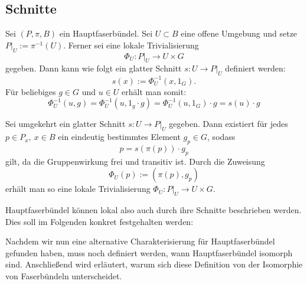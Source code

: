 \subsection{Schnitte}

Sei $(P, \pi, B)$ ein Hauptfaserbündel. Sei $U \subset B$ eine offene Umgebung und setze $P|_U := \pi^{-1}(U)$. Ferner sei eine lokale Trivialisierung \[\Phi_U \colon P|_U \to U \times G\] gegeben.
Dann kann wie folgt ein glatter Schnitt $s \colon U \to P|_U$ definiert werden: \[s(x) := \Phi_U^{-1}(x,1_G).\]
Für beliebiges $g \in G$ und $u \in U$ erhält man somit: \[\Phi_U^{-1}(u,g) = \Phi_U^{-1}(u,1_g \cdot g) = \Phi_U^{-1}(u,1_G) \cdot g = s(u) \cdot g\]

Sei umgekehrt ein glatter Schnitt $s \colon U \to P|_U$ gegeben. Dann existiert für jedes $p \in P_x, \ x \in B$ ein eindeutig bestimmtes Element $g_p \in G$, sodass \[p = s(\pi(p)) \cdot g_p\] gilt,
da die Gruppenwirkung frei und transitiv ist.
Durch die Zuweisung \[\Phi_U(p) := (\pi(p), g_p)\] erhält man so eine lokale Trivialisierung $\Phi_U \colon P|_U \to U \times G$.


Hauptfaserbündel können lokal also auch durch ihre Schnitte beschrieben werden. Dies soll im Folgenden konkret festgehalten werden:


Nachdem wir nun eine alternative Charakterisierung für Hauptfaserbündel gefunden haben, muss noch definiert werden, wann Hauptfaserbündel isomorph sind. Anschließend wird erläutert, warum sich diese
Definition von der Isomorphie von Faserbündeln unterscheidet.


